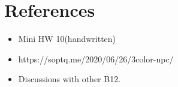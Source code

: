 \documentclass[12pt, a4paper, UTF8]{article}
\begin{document}
\pagestyle{fancy}
\fancyhead{} %
\fancyfoot{} %
\fancyfoot[C]{\thepage}
\section*{References}
\begin{itemize}
    \item Mini HW 10(handwritten)
    \item https://soptq.me/2020/06/26/3color-npc/
    \item Discussions with other B12.
\end{itemize}
\pagebreak
\end{document}
